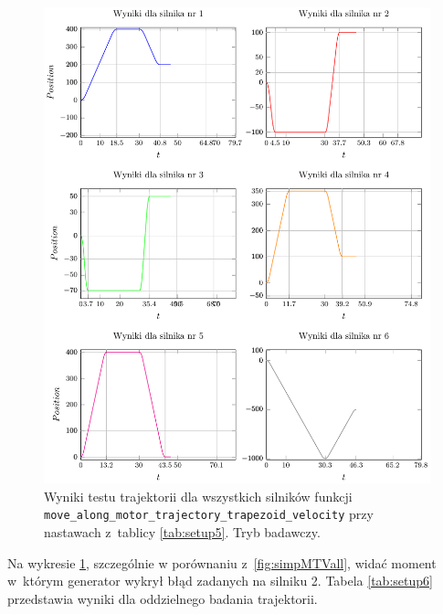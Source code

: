 \documentclass[a4paper, 12pt]{article}
\begin{document}
	\begin{figure}[H]
		\centering
		\includegraphics[scale=1.1]{raport_graphs/simpMTVRall.pdf}
		\caption{Wyniki testu trajektorii dla wszystkich silników funkcji \texttt{move\_along\_motor\_trajectory\_trapezoid\_velocity} przy nastawach z~tablicy \ref{tab:setup5}. Tryb badawczy.}		
		\label{fig:simpMTVRall}
	\end{figure}
	
	Na wykresie \ref{fig:simpMTVRall}, szczególnie w porównaniu z~\ref{fig:simpMTVall}, widać moment w~którym generator wykrył błąd zadanych na silniku 2. Tabela \ref{tab:setup6} przedstawia wyniki dla oddzielnego badania trajektorii.
	
\end{document}
